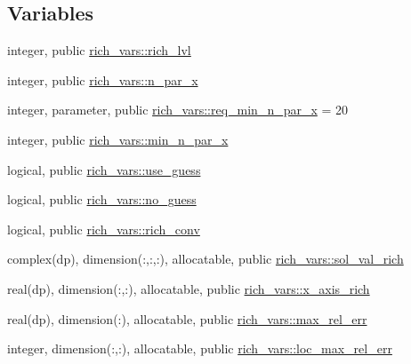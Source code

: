 \subsection*{Variables}
\begin{DoxyCompactItemize}
\item 
integer, public \hyperlink{namespacerich__vars_a1b7734ba9ce6cc153b22387e638093c0}{rich\+\_\+vars\+::rich\+\_\+lvl}
\item 
integer, public \hyperlink{namespacerich__vars_a7a32b8d53450cf925042cd5ddc7e23e6}{rich\+\_\+vars\+::n\+\_\+par\+\_\+x}
\item 
integer, parameter, public \hyperlink{namespacerich__vars_a94e61b5125377ab3e984334998f5ebae}{rich\+\_\+vars\+::req\+\_\+min\+\_\+n\+\_\+par\+\_\+x} = 20
\item 
integer, public \hyperlink{namespacerich__vars_a07841cccca6e6ee59aeb4e0661558eda}{rich\+\_\+vars\+::min\+\_\+n\+\_\+par\+\_\+x}
\item 
logical, public \hyperlink{namespacerich__vars_aedc7171560db899c515d1610d99582c9}{rich\+\_\+vars\+::use\+\_\+guess}
\item 
logical, public \hyperlink{namespacerich__vars_a167fe55b5d9c1a4566729da683466947}{rich\+\_\+vars\+::no\+\_\+guess}
\item 
logical, public \hyperlink{namespacerich__vars_adf63efd509bbcda4f77fd7e88c766081}{rich\+\_\+vars\+::rich\+\_\+conv}
\item 
complex(dp), dimension(\+:,\+:,\+:), allocatable, public \hyperlink{namespacerich__vars_ae1d3c7deb4c8becd036a63367fca5e20}{rich\+\_\+vars\+::sol\+\_\+val\+\_\+rich}
\item 
real(dp), dimension(\+:,\+:), allocatable, public \hyperlink{namespacerich__vars_a7f584d9b84f3e3e230b45ce4b8e0e9b1}{rich\+\_\+vars\+::x\+\_\+axis\+\_\+rich}
\item 
real(dp), dimension(\+:), allocatable, public \hyperlink{namespacerich__vars_afac4d06d60829484cfb7d4964964945b}{rich\+\_\+vars\+::max\+\_\+rel\+\_\+err}
\item 
integer, dimension(\+:,\+:), allocatable, public \hyperlink{namespacerich__vars_af3df7361e33058bc83fe43a803173d89}{rich\+\_\+vars\+::loc\+\_\+max\+\_\+rel\+\_\+err}
\end{DoxyCompactItemize}
